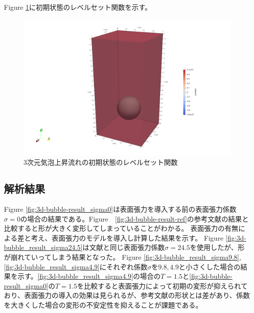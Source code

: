 \documentclass[8pt,a4paper]{article}
\begin{document}
Figure \ref{fig:3d-bubble-levelset_t0_3d}に初期状態のレベルセット関数を示す。

\begin{figure}[H]
	\centering
	\includegraphics[width=10truecm]{pics/3d-bubble/levelset_t0_3d.pdf}
	\caption{3次元気泡上昇流れの初期状態のレベルセット関数}
	\label{fig:3d-bubble-levelset_t0_3d}
\end{figure}

\subsection{解析結果}

Figure \ref{fig:3d-bubble-result_sigma0}は表面張力を導入する前の表面張力係数$\sigma=0$の場合の結果である。Figure　\ref{fig:3d-bubble-result-ref}の参考文献の結果と比較すると形が大きく変形してしまっていることがわかる。
表面張力の有無による差と考え、表面張力のモデルを導入し計算した結果を示す。
Figure \ref{fig:3d-bubble_result_sigma24.5}は文献と同じ表面張力係数$\sigma=24.5$を使用したが、形が崩れていってしまう結果となった。
Figure \ref{fig:3d-bubble_result_sigma9.8}, \ref{fig:3d-bubble_result_sigma4.9}にそれぞれ係数$\sigma$を$9.8, 4.9$と小さくした場合の結果を示す。\ref{fig:3d-bubble_result_sigma4.9}の場合の$T=1.5$と\ref{fig:3d-bubble-result_sigma0}の$T=1.5$を比較すると表面張力によって初期の変形が抑えられており、表面張力の導入の効果は見られるが、参考文献の形状とは差があり、係数を大きくした場合の変形の不安定性を抑えることが課題である。
\end{document}
